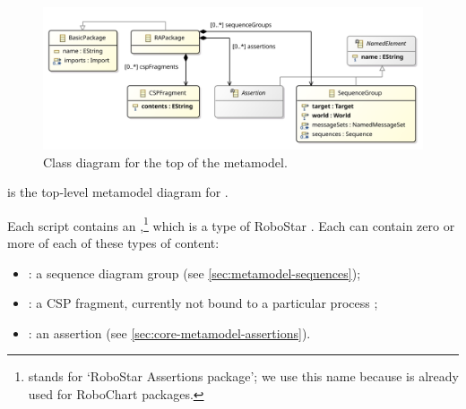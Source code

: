 \begin{figure}[htb]
  \centering
  \includegraphics[width=.85\textwidth]{diagrams/Top}
  \caption{Class diagram for the top of the \langname{} metamodel.}
  \label{fig:metamodel-top}
\end{figure}

 is the top-level metamodel diagram for \langname.

Each \langname{} script contains an \mrapackage,\footnote{\mrapackage{} stands
  for `RoboStar Assertions package'; we use this name because \mrcpackage{} is
  already used for RoboChart packages.}
which is a type of RoboStar \mbasicpackage.
Each \mrapackage{} can contain zero or more of each of these types of content:

\begin{itemize}
\item
  \msequencegroup:
  a sequence diagram group
  (see \cref{sec:metamodel-sequences});
\item
  \mcspgroup:
  a CSP fragment, currently not bound to a particular process
  ;
\item
  \massertion:
  an assertion
  (see \cref{sec:core-metamodel-assertions}).
\end{itemize}

